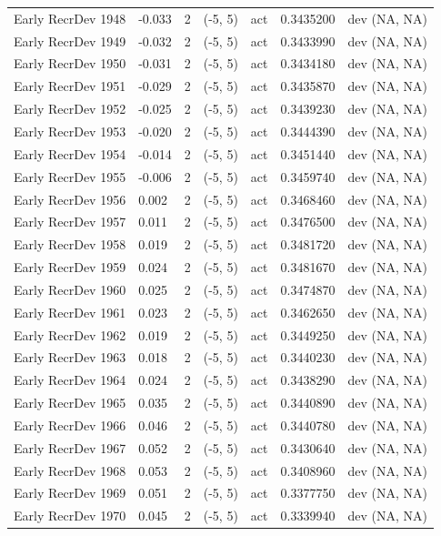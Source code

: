 \documentclass[11pt,
  english,
  a4paper,
]{article}
\begin{document}
\begin{landscape}
\begin{longtable}[t]{>{\raggedright\arraybackslash}p{7cm}lllll>{\raggedright\arraybackslash}p{4cm}}
Early RecrDev 1948 & -0.033 & 2 & (-5, 5) & act & 0.3435200 & dev (NA, NA)\\
Early RecrDev 1949 & -0.032 & 2 & (-5, 5) & act & 0.3433990 & dev (NA, NA)\\
Early RecrDev 1950 & -0.031 & 2 & (-5, 5) & act & 0.3434180 & dev (NA, NA)\\
Early RecrDev 1951 & -0.029 & 2 & (-5, 5) & act & 0.3435870 & dev (NA, NA)\\
Early RecrDev 1952 & -0.025 & 2 & (-5, 5) & act & 0.3439230 & dev (NA, NA)\\
Early RecrDev 1953 & -0.020 & 2 & (-5, 5) & act & 0.3444390 & dev (NA, NA)\\
Early RecrDev 1954 & -0.014 & 2 & (-5, 5) & act & 0.3451440 & dev (NA, NA)\\
Early RecrDev 1955 & -0.006 & 2 & (-5, 5) & act & 0.3459740 & dev (NA, NA)\\
Early RecrDev 1956 & 0.002 & 2 & (-5, 5) & act & 0.3468460 & dev (NA, NA)\\
Early RecrDev 1957 & 0.011 & 2 & (-5, 5) & act & 0.3476500 & dev (NA, NA)\\
Early RecrDev 1958 & 0.019 & 2 & (-5, 5) & act & 0.3481720 & dev (NA, NA)\\
Early RecrDev 1959 & 0.024 & 2 & (-5, 5) & act & 0.3481670 & dev (NA, NA)\\
Early RecrDev 1960 & 0.025 & 2 & (-5, 5) & act & 0.3474870 & dev (NA, NA)\\
Early RecrDev 1961 & 0.023 & 2 & (-5, 5) & act & 0.3462650 & dev (NA, NA)\\
Early RecrDev 1962 & 0.019 & 2 & (-5, 5) & act & 0.3449250 & dev (NA, NA)\\
Early RecrDev 1963 & 0.018 & 2 & (-5, 5) & act & 0.3440230 & dev (NA, NA)\\
Early RecrDev 1964 & 0.024 & 2 & (-5, 5) & act & 0.3438290 & dev (NA, NA)\\
Early RecrDev 1965 & 0.035 & 2 & (-5, 5) & act & 0.3440890 & dev (NA, NA)\\
Early RecrDev 1966 & 0.046 & 2 & (-5, 5) & act & 0.3440780 & dev (NA, NA)\\
Early RecrDev 1967 & 0.052 & 2 & (-5, 5) & act & 0.3430640 & dev (NA, NA)\\
Early RecrDev 1968 & 0.053 & 2 & (-5, 5) & act & 0.3408960 & dev (NA, NA)\\
Early RecrDev 1969 & 0.051 & 2 & (-5, 5) & act & 0.3377750 & dev (NA, NA)\\
Early RecrDev 1970 & 0.045 & 2 & (-5, 5) & act & 0.3339940 & dev (NA, NA)\\

\end{longtable}
\end{landscape}
\end{document}
